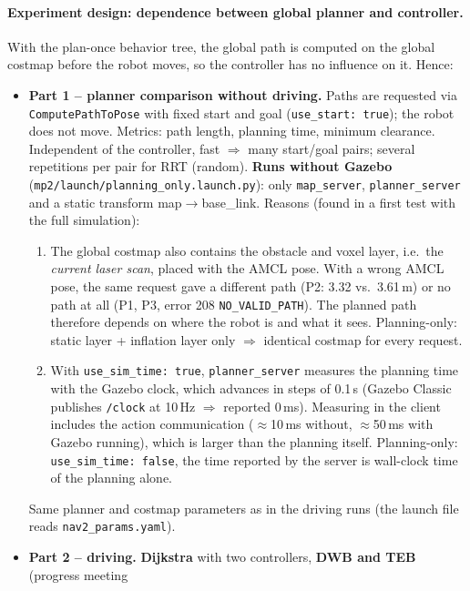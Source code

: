 \documentclass[10pt]{article}
\newcommand{\pkg}[1]{\texttt{#1}}
\begin{document}
\paragraph{Experiment design: dependence between global planner and controller.}
With the plan-once behavior tree, the global path is computed on the global costmap before the
robot moves, so the controller has no influence on it. Hence:
\begin{itemize}
  \item \textbf{Part 1 -- planner comparison without driving.} Paths are requested via
        \pkg{ComputePathToPose} with fixed start and goal (\pkg{use\_start: true}); the robot does not move.
        Metrics: path length, planning time, minimum clearance. Independent of the controller,
        fast $\Rightarrow$ many start/goal pairs; several repetitions per pair for RRT (random).
        \textbf{Runs without Gazebo} (\pkg{mp2/launch/planning\_only.launch.py}): only \pkg{map\_server},
        \pkg{planner\_server} and a static transform map$\rightarrow$base\_link. Reasons (found in a first test
        with the full simulation):
        \begin{enumerate}
          \item The global costmap also contains the obstacle and voxel layer, i.e.\ the \emph{current laser scan},
                placed with the AMCL pose. With a wrong AMCL pose, the same request gave a different path (P2: 3.32
                vs.\ 3.61\,m) or no path at all (P1, P3, error 208 \pkg{NO\_VALID\_PATH}). The planned path therefore
                depends on where the robot is and what it sees. Planning-only: static layer + inflation layer only
                $\Rightarrow$ identical costmap for every request.
          \item With \pkg{use\_sim\_time: true}, \pkg{planner\_server} measures the planning time with the
                Gazebo clock, which advances in steps of 0.1\,s (Gazebo Classic publishes \pkg{/clock} at 10\,Hz $\Rightarrow$ reported 0\,ms). Measuring in the
                client includes the action communication ($\approx$10\,ms without, $\approx$50\,ms with Gazebo running),
                which is larger than the planning itself. Planning-only: \pkg{use\_sim\_time: false}, the time
                reported by the server is wall-clock time of the planning alone.
        \end{enumerate}
        Same planner and costmap parameters as in the driving runs (the launch file reads \pkg{nav2\_params.yaml}).
  \item \textbf{Part 2 -- driving.} \textbf{Dijkstra} with two controllers, \textbf{DWB and TEB} (progress meeting

\end{itemize}
\end{document}
